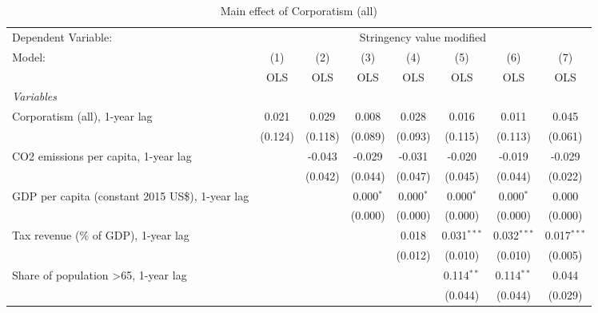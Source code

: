 
\begin{table}[htbp]
   \caption{Main effect of Corporatism (all)}
   \centering
   \begin{tabular}{lccccccc}
      \toprule
      Dependent Variable: & \multicolumn{7}{c}{Stringency value modified}\\
      Model:                                                & (1)     & (2)     & (3)         & (4)         & (5)           & (6)           & (7)\\  
                                                            &  OLS    & OLS     & OLS         & OLS         & OLS           & OLS           & OLS\\  
      \midrule
      \emph{Variables}\\
      Corporatism (all), 1-year lag                         & 0.021   & 0.029   & 0.008       & 0.028       & 0.016         & 0.011         & 0.045\\   
                                                            & (0.124) & (0.118) & (0.089)     & (0.093)     & (0.115)       & (0.113)       & (0.061)\\   
      CO2 emissions per capita, 1-year lag                  &         & -0.043  & -0.029      & -0.031      & -0.020        & -0.019        & -0.029\\   
                                                            &         & (0.042) & (0.044)     & (0.047)     & (0.045)       & (0.044)       & (0.022)\\   
      GDP per capita (constant 2015 US\$), 1-year lag       &         &         & 0.000$^{*}$ & 0.000$^{*}$ & 0.000$^{*}$   & 0.000$^{*}$   & 0.000\\   
                                                            &         &         & (0.000)     & (0.000)     & (0.000)       & (0.000)       & (0.000)\\   
      Tax revenue (\% of GDP), 1-year lag                   &         &         &             & 0.018       & 0.031$^{***}$ & 0.032$^{***}$ & 0.017$^{***}$\\   
                                                            &         &         &             & (0.012)     & (0.010)       & (0.010)       & (0.005)\\   
      Share of population >65, 1-year lag                   &         &         &             &             & 0.114$^{**}$  & 0.114$^{**}$  & 0.044\\   
                                                            &         &         &             &             & (0.044)       & (0.044)       & (0.029)\\   

\end{tabular}
\end{table}
